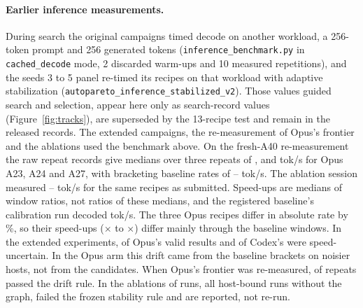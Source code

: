 \documentclass{article}
\begin{document}
\paragraph{Earlier inference measurements.} During search the original campaigns timed decode on another workload, a 256-token prompt and 256 generated tokens (\texttt{inference\_benchmark.py} in \texttt{cached\_decode} mode, 2 discarded warm-ups and 10 measured repetitions), and the seeds 3 to 5 panel re-timed its recipes on that workload with adaptive stabilization (\texttt{autopareto\_inference\_stabilized\_v2}). Those values guided search and selection, appear here only as search-record values (Figure~\ref{fig:tracks}), are superseded by the 13-recipe test and remain in the released records. The extended campaigns, the re-measurement of Opus's frontier and the ablations used the benchmark above. On the fresh-A40 re-measurement the raw repeat records give medians over three repeats of \CROpAbsTwentyThree, \CROpAbsTwentyFour{} and \CROpAbsTwentySeven{} tok/s for Opus A23, A24 and A27, with bracketing baseline rates of \CRPTwoBaseLo--\CRPTwoBaseHi{} tok/s. The ablation session measured \CRIAAbsLo--\CRIAAbsHi{} tok/s for the same recipes as submitted. Speed-ups are medians of window ratios, not ratios of these medians, and the registered baseline's calibration run decoded \CRAgBaseDecode{} tok/s. The three Opus recipes differ in absolute rate by \CROpAbsSpreadPct\%, so their speed-ups (\CROpDecodeLo$\times$ to \CROpDecodeHi$\times$) differ mainly through the baseline windows. In the extended experiments, \CROpUncertain{} of Opus's \CROpValid{} valid results and \CRCxUncertain{} of Codex's \CRCxValid{} were speed-uncertain. In the Opus arm this drift came from the baseline brackets on noisier hosts, not from the candidates. When Opus's frontier was re-measured, \CROpStableRepeats{} of \CROpRepeats{} repeats passed the drift rule. In the ablations \CRIAUnstable{} of \CRIARuns{} runs, all host-bound runs without the graph, failed the frozen stability rule and are reported, not re-run.
\end{document}
